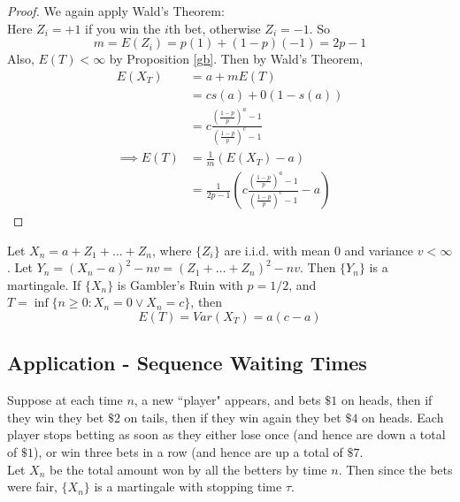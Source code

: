 \documentclass[11pt]{article}
\begin{document}
    \begin{proof}
    	We again apply Wald's Theorem:\\
    	Here $Z_i = +1$ if you win the $i$th bet, otherwise $Z_i = -1$. So $$m = E(Z_i) = p(1) + (1-p)(-1) = 2p-1$$ Also, $E(T) < \infty$ by Proposition \ref{gb}. Then by Wald's Theorem,
    	\begin{align*}
    		E(X_T) &= a + mE(T) \\
    		&= cs(a) + 0(1-s(a)) \\
    		&= c \frac{\left( \frac{1-p}{p}\right)^a - 1}{\left( \frac{1-p}{p}\right)^c - 1}\\
    		\implies E(T) &= \frac{1}{m}(E(X_T) - a) \\
    		&= \frac{1}{2p-1}\left( c \frac{\left( \frac{1-p}{p}\right)^a - 1}{\left( \frac{1-p}{p}\right)^c - 1}-a\right)
    	\end{align*}
    \end{proof}
    
    \lemma Let $X_n = a + Z_1 + \hdots + Z_n$, where $\{Z_i\}$ are i.i.d. with mean 0 and variance $v < \infty$. Let $Y_n = (X_n - a)^2 - nv = (Z_1 + \hdots + Z_n)^2 - nv$. Then $\{Y_n\}$ is a martingale.
    \corollary If $\{X_n\}$ is Gambler's Ruin with $p = 1/2$, and $T = \inf\{n \geq 0: X_n = 0 \lor X_n = c\}$, then 
    $$E(T) = Var(X_T) = a(c-a)$$
    
    \subsection{Application - Sequence Waiting Times}
    Suppose at each time $n$, a new ``player" appears, and bets $\$ 1$ on heads, then if they win they bet $\$2$ on tails, then if they win again they bet $\$4$ on heads. Each player stops betting as soon as they either lose once (and hence are down a total of $\$1$), or win three bets in a row (and hence are up a total of $\$7$.\\
    Let $X_n$ be the total amount won by all the betters by time $n$. Then since the bets were fair, $\{X_n\}$ is a martingale with stopping time $\tau$. 
    
\end{document}
